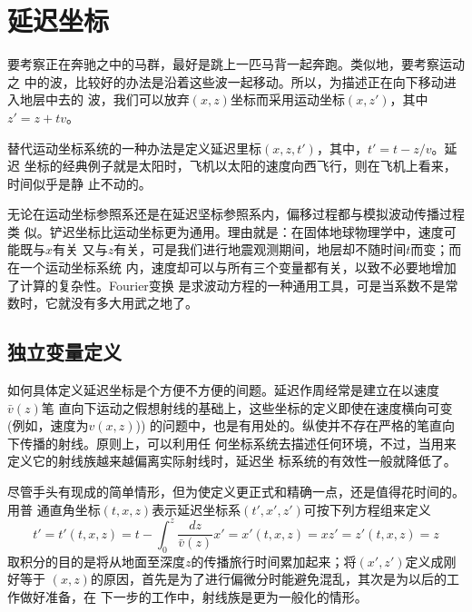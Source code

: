 \section{延迟坐标}
\label{sec:2.6}
要考察正在奔驰之中的马群，最好是跳上一匹马背一起奔跑。类似地，要考察运动之
中的波，比较好的办法是沿着这些波一起移动。所以，为描述正在向下移动进入地层中去的
波，我们可以放弃$(x,z)$坐标而采用运动坐标$(x,z')$，其中$z'=z+tv$。

替代运动坐标系统的一种办法是定义延迟里标$(x,z,t')$，其中，$t'=t-z/v$。延迟
坐标的经典例子就是太阳时，飞机以太阳的速度向西飞行，则在飞机上看来，时间似乎是静
止不动的。

无论在运动坐标参照系还是在延迟坚标参照系内，偏移过程都与模拟波动传播过程类
似。铲迟坐标比运动坐标更为通用。理由就是：在固体地球物理学中，速度可能既与$x$有关
又与$z$有关，可是我们进行地震观测期间，地层却不随时间$t$而变；而在一个运动坐标系统
内，速度却可以与所有三个变量都有关，以致不必要地增加了计算的复杂性。Fourier变换
是求波动方程的一种通用工具，可是当系数不是常数时，它就没有多大用武之地了。


\subsection{独立变量定义}
\label{sec:2.6.1}
如何具体定义延迟坐标是个方便不方便的间题。延迟作周经常是建立在以速度$\bar{v}(z)$笔
直向下运动之假想射线的基础上，这些坐标的定义即使在速度横向可变(例如，速度为$v(x,z)$))
的问题中，也是有用处的。纵使并不存在严格的笔直向下传播的射线。原则上，可以利用任
何坐标系统去描述任何环境，不过，当用来定义它的射线族越来越偏离实际射线时，延迟坐
标系统的有效性一般就降低了。

尽管手头有现成的简单情形，但为使定义更正式和精确一点，还是值得花时间的。用普
通直角坐标$(t,x,z)$表示延迟坐标系$(t',x',z')$可按下列方程组来定义
\begin{subequations}
\begin{equation}
t'=t'(t,x,z)=t-\int_0^z\frac{dz}{\bar{v}(z)}
\label{eq:ex2.6.1a}
\end{equation}
\begin{equation}
x'=x'(t,x,z)=x
\label{eq:ex2.6.1b}
\end{equation}
\begin{equation}
z'=z'(t,x,z)=z
\label{eq:ex2.6.1c}
\end{equation}
\label{eq:ex2.6.1}
\end{subequations}
取积分的目的是将从地面至深度$z$的传播旅行时间累加起来；将$(x',z')$定义成刚好等于
$(x,z)$的原因，首先是为了进行偏微分时能避免混乱，其次是为以后的工作做好准备，在
下一步的工作中，射线族是更为一般化的情形。

